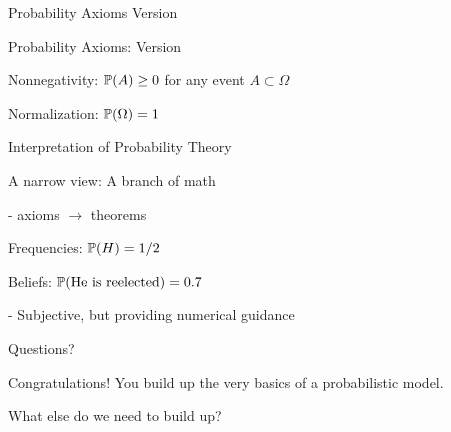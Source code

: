 \documentclass[fleqn,aspectratio=169]{beamer}
\begin{document}
\begin{frame}{Probability Axioms Version  }

\begin{block}{Probability Axioms: Version  }
\plitemsep 0.1in
\bce[{A}1.] 
\item Nonnegativity: $\mathbb{P}( A ) \geq 0$ for any event $A \subset \Omega$
\item Normalization: $\mathbb{P}( \Omega ) = 1$


\ece
\end{block}


\end{frame}

\begin{frame}{Interpretation of Probability Theory}


\plitemsep 0.5in
\bci
\item<1-> A narrow view: A branch of math

- axioms $\rightarrow$ theorems


\item<2-> Frequencies: $\mathbb{P}( H ) = 1/2$

\item<3-> Beliefs: $\mathbb{P}( \text{He is reelected} ) = 0.7$

- Subjective, but providing numerical guidance
\eci

\end{frame}




\begin{frame}{}
\vspace{2cm}
\LARGE Questions?


\medskip
\LARGE Congratulations! You build up the very basics of a probabilistic model. 

\medskip

\LARGE What else do we need to build up?
\end{frame}
\end{document}
